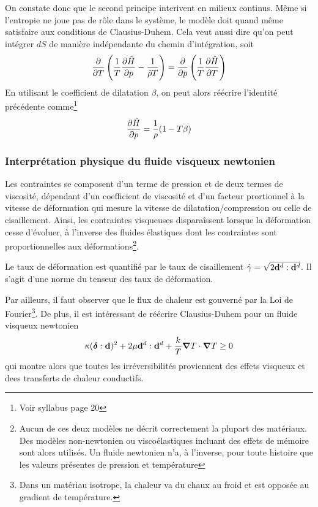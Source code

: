 \documentclass[a4paper,11pt]{report}
\newcommand{\bs}[1]{\boldsymbol{#1}}
\newcommand{\recip}[1]{\frac{1}{#1}}
\begin{document}
        On constate donc que le second principe interivent en milieux continus. Même si l'entropie ne joue pas de rôle dans le système, le modèle doit quand même satisfaire aux conditions de Clausius-Duhem. Cela veut aussi dire qu'on peut intégrer $dS$ de manière indépendante du chemin d'intégration, soit
        \begin{equation}
          \pdv{}{T}\left(\recip{T}\pdv{\hat{H}}{p} - \recip{\hat{\rho}T}\right) = \pdv{}{p}\left(\recip{T}\pdv{\hat{H}}{T}\right)
        \end{equation}
        En utilisant le coefficient de dilatation $\beta$, on peut alors réécrire l'identité précédente comme\footnote{Voir syllabus page 20}
        \begin{equation}
          \pdv{\hat{H}}{p} = \recip{\rho}(1-T\beta)
        \end{equation}

        \subsubsection{Interprétation physique du fluide visqueux newtonien}
          Les contraintes se composent d'un terme de pression et de deux termes de viscosité, dépendant d'un coefficient de viscosité et d'un facteur prortionnel à la vitesse de déformation qui mesure la vitesse de dilatation/compression ou celle de cisaillement. Ainsi, les contraintes visqueuses disparaîssent lorsque la déformation cesse d'évoluer, à l'inverse des fluides élastiques dont les contraintes sont proportionnelles aux déformations\footnote{Aucun de ces deux modèles ne décrit correctement la plupart des matériaux. Des modèles non-newtonien ou viscoélastiques incluant des effets de mémoire sont alors utilisés. Un fluide newtonien n'a, à l'inverse, pour toute histoire que les valeurs présentes de pression et température}.

          Le taux de déformation est quantifié par le taux de cisaillement $\dot{\gamma} = \sqrt{2\vb{d}^d:\vb{d}^d}$. Il s'agit d'une norme du tenseur des taux de déformation.

          Par ailleurs, il faut observer que le flux de chaleur est gouverné par la Loi de Fourier\footnote{Dans un matériau isotrope, la chaleur va du chaux au froid et est opposée au gradient de température.}. De plus, il est intéressant de réécrire Clausius-Duhem pour un fluide visqueux newtonien
          \begin{equation}
            \kappa (\bs{\delta}:\vb{d})^2 + 2 \mu \vb{d}^d : \vb{d}^d + \frac{k}{T}\grad T \cdot \grad T \geq 0
          \end{equation}
          qui montre alors que toutes les irréversibilités proviennent des effets visqueux et dees transferts de chaleur conductifs.
\end{document}
